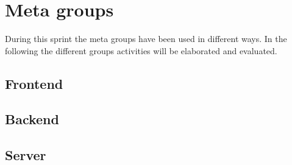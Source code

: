 \section{Meta groups}
During this sprint the meta groups have been used in different ways. 
In the following the different groups activities will be elaborated and evaluated.

\subsection{Frontend}

\subsection{Backend}

\subsection{Server}
